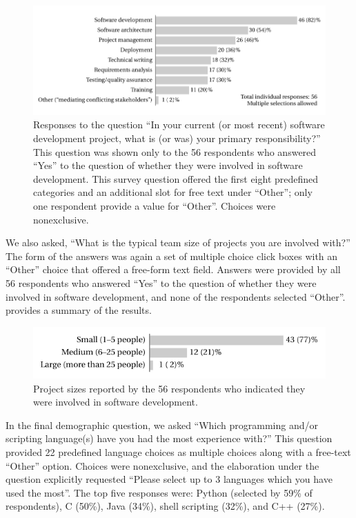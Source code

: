 \documentclass{casicswhitepaper}
\newcommand{\totaldevelopers}{56\xspace}
\begin{document}
\begin{figure}[thb]
  \vspace*{-1ex}
  \centering
  \includegraphics[width=6in]{files/plots/responsibilities.pdf}
  \vspace*{-5ex}
  \caption{Responses to the question  ``In your current (or most recent) software development project, what is (or was) your primary responsibility?''  This question was shown only to the 56 respondents who answered ``Yes'' to the question of whether they were involved in software development.  This survey question offered the first eight predefined categories and an additional slot for free text under ``Other''; only one respondent provide a value for ``Other''.  Choices were nonexclusive.}
  \label{responsibilities}
\end{figure}

We also asked, ``What is the typical team size of projects you are involved with?''  The form of the answers was again a set of multiple choice click boxes with an ``Other'' choice that offered a free-form text field.  Answers were provided by all \totaldevelopers respondents who answered ``Yes'' to the question of whether they were involved in software development, and none of the respondents selected ``Other''.   provides a summary of the results.

\begin{figure}[htb]
  \centering
  \includegraphics{files/plots/project-sizes.pdf}
  \vspace*{-3ex}
  \caption{Project sizes reported by the \totaldevelopers respondents who indicated they were involved in software development.}
  \label{project-sizes}
\end{figure}

In the final demographic question, we asked ``Which programming and/or scripting language(s) have you had the most experience with?''  This question provided 22 predefined language choices as multiple choices along with a free-text ``Other'' option.  Choices were nonexclusive, and the elaboration under the question explicitly requested ``Please select up to 3 languages which you have used the most''.   The top five responses were: Python (selected by 59\% of respondents), C (50\%), Java (34\%), shell scripting (32\%), and C++ (27\%).
\end{document}
